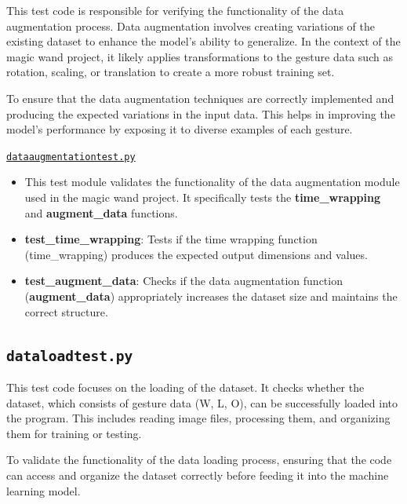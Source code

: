 			This test code is responsible for verifying the functionality of the data augmentation process. Data augmentation involves creating variations of the existing dataset to enhance the model's ability to generalize. In the context of the magic wand project, it likely applies transformations to the gesture data such as rotation, scaling, or translation to create a more robust training set.
			
			To ensure that the data augmentation techniques are correctly implemented and producing the expected variations in the input data. This helps in improving the model's performance by exposing it to diverse examples of each gesture.
			
			\href{../Documents/MagicWand/ML23-06-Magic-Wand-with-an-Arduino-Nano-33-BLE-sense/Sourcecode/Code/Datatraining/Tests/dataaugmentationtest.py}{\texttt{dataaugmentationtest.py}}
		
			\begin{itemize}
				
				\item This test module validates the functionality of the data augmentation module used in the magic wand project. It specifically tests the \textbf{time\_wrapping} and \textbf{augment\_data} functions.
				 
				\item \textbf{test\_time\_wrapping}: Tests if the time wrapping function (time\_wrapping) produces the expected output dimensions and values.
				
				\item \textbf{test\_augment\_data}: Checks if the data augmentation function (\textbf{augment\_data}) appropriately increases the dataset size and maintains the correct structure.
				
			\end{itemize}
	
			\subsection{\texttt{dataloadtest.py}}
			
			This test code focuses on the loading of the dataset. It checks whether the dataset, which consists of gesture data (W, L, O), can be successfully loaded into the program. This includes reading image files, processing them, and organizing them for training or testing.
			
			To validate the functionality of the data loading process, ensuring that the code can access and organize the dataset correctly before feeding it into the machine learning model.
			

